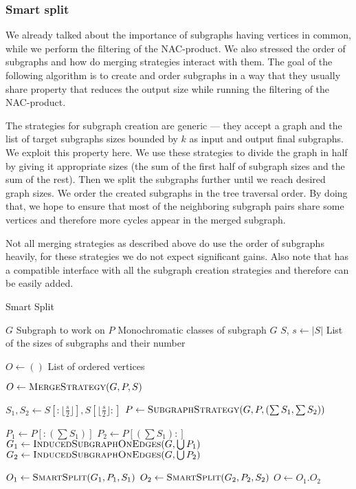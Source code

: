 \subsubsection*{Smart split}%
\label{sec:smart_split}

We already talked about the importance of subgraphs having vertices in common,
while we perform the filtering of the NAC-product.
We also stressed the order of subgraphs and
how do merging strategies interact with them.
The goal of the following algorithm is to create and order subgraphs in a way that they usually
share property that reduces the output size while running
the filtering of the NAC-product.

The strategies for subgraph creation are generic --- they accept a graph and
the list of target subgraphs sizes bounded by \( k \) as input and output final subgraphs.
We exploit this property here.
We use these strategies to divide the graph in half by giving it appropriate
sizes (the sum of the first half of subgraph sizes and the sum of the rest).
Then we split the subgraphs further until we reach desired graph sizes.
We order the created subgraphs in the tree traversal order.
By doing that, we hope to ensure that most of the neighboring subgraph pairs share
some vertices and therefore more cycles appear in the merged subgraph.

Not all merging strategies as described above do use the order of subgraphs heavily,
for these strategies we do not expect significant gains.
Also note that  has a compatible interface with
all the subgraph creation strategies and therefore can be easily added.

\begin{algorithm}
	\caption{Smart Split}%
	\label{alg:smart_split}
	\begin{algorithmic}[1]
		\Require{} $G$
		\Comment{} Subgraph to work on
		\Require{} $P$
		\Comment{} Monochromatic classes of subgraph $G$
		\Require{} $S$, $s \gets |S|$
		\Comment{} List of the sizes of subgraphs and their number

		\Ensure{} $O \gets ()$
		\Comment{} List of ordered vertices

		\State{} $O \gets \Call{MergeStrategy}{G, P, S}$
		\State{}
		\Return{}
		\EndIf{}

		\State{} $S_1, S_2 \gets S[:\lfloor\frac{s}{2}\rfloor], S[\lfloor\frac{s}{2}\rfloor:]$
		\State{} $P \gets \Call{SubgraphStrategy}{G, P, (\sum S_{1}, \sum S_{2})}$

		\State{} $P_1 \gets P[:(\sum S_1)]$
		\State{} $P_2 \gets P[(\sum S_1):]$
		\State{} $G_1 \gets \Call{InducedSubgraphOnEdges}{G, \bigcup P_1}$
		\State{} $G_2 \gets \Call{InducedSubgraphOnEdges}{G, \bigcup P_2}$

		\State{} $O_1 \gets \Call{SmartSplit}{G_1, P_1, S_1}$
		\State{} $O_2 \gets \Call{SmartSplit}{G_2, P_2, S_2}$
		\State{} $O \gets O_{1}.O_{2}$
	\end{algorithmic}
\end{algorithm}



